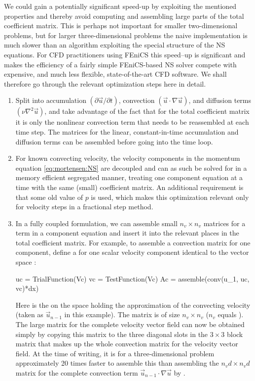 We could gain a potentially significant speed-up by exploiting the
mentioned properties and thereby avoid computing and assembling large
parts of the total coefficient matrix.
This is perhaps not important for smaller two-dimensional problems,
but for larger three-dimensional problems the naive implementation is
much slower than an algorithm exploiting the special structure of the
NS equations.  For CFD practitioners using FEniCS this speed--up is
significant and makes the efficiency of a fairly simple FEniCS-based NS
solver compete with expensive, and much less flexible, state-of-the-art
CFD software.  We shall therefore go through the relevant optimization
steps here in detail.
\begin{enumerate}
 \item Split  into accumulation $(\partial \vec{u}/\partial t)$,
   convection $(\vec{u} \cdot \nabla \vec{u})$, and diffusion terms
   $(\nu\nabla^2 \vec{u})$, and take advantage of the fact that for the total
   coefficient matrix it is only the nonlinear convection term that
   needs to be reassembled at each time step. The matrices for the
   linear, constant-in-time accumulation and diffusion terms can be
   assembled before going into the time loop.

\item For known convecting velocity, the velocity components in
  the momentum equation \eqref{eq:mortensen:NS} are decoupled and
  can as such be solved for in a memory efficient segregated manner,
  treating one component equation at a time with the same (small)
  coefficient matrix. An additional requirement is that some old value
  of $p$ is used, which makes this optimization relevant only for
  velocity steps in a fractional step method.

\item In a fully coupled formulation, we can assemble small
  $n_v\times n_v$ matrices for a term in a component equation and
  insert it into the relevant places in the total coefficient matrix.
  For example, to assemble a convection matrix for one component,
  define a   for one scalar velocity component
  identical to the vector space :
\begin{python}
uc = TrialFunction(Vc)
vc = TestFunction(Vc)
Ac = assemble(conv(u_1, uc, vc)*dx)
\end{python}
Here  is the  on the space  holding the
approximation of the convecting velocity (taken as $\vec{u}_{n-1}$ in
this example).  The matrix  is of size $n_v\times n_v$ ($n_v$
equals ).  The large matrix for the complete velocity
vector field can now be obtained simply by copying this 
matrix to the three diagonal slots in the $3\times 3$ block matrix
that makes up the whole convection matrix for the velocity vector
field.  At the time of writing, it is for a three-dimensional problem
approximately 20 times faster to assemble this  than
assembling the $n_vd\times n_vd$ matrix for the complete convection
term $\vec{u}_{n-1} \cdot \nabla \vec{u}$ by .


\end{enumerate}
